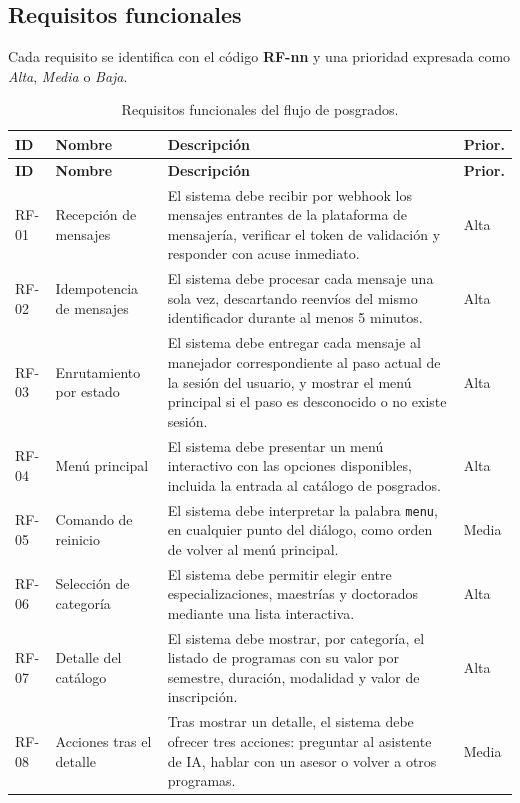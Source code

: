 \documentclass[12pt,a4paper]{report}
\newcommand{\tablacompacta}{\setstretch{1.1}\small}
\newcommand{\cabecera}[1]{\rowcolor{filacabecera}#1}
\begin{document}
\clearpage
\subsection{Requisitos funcionales}

Cada requisito se identifica con el código \textbf{RF-nn} y una prioridad expresada como
\textit{Alta}, \textit{Media} o \textit{Baja}.

{\tablacompacta
\begin{longtable}{p{1.4cm}p{3.3cm}p{7.4cm}p{1.4cm}}
\caption{Requisitos funcionales del flujo de posgrados.}\label{tab:rf}\\
\toprule
\cabecera{\textbf{ID}} & \textbf{Nombre} & \textbf{Descripción} & \textbf{Prior.} \\
\midrule
\endfirsthead
\toprule
\textbf{ID} & \textbf{Nombre} & \textbf{Descripción} & \textbf{Prior.} \\
\midrule
\endhead
\bottomrule
\endfoot
RF-01 & Recepción de mensajes & El sistema debe recibir por webhook los mensajes entrantes de la plataforma de mensajería, verificar el token de validación y responder con acuse inmediato. & Alta \\
RF-02 & Idempotencia de mensajes & El sistema debe procesar cada mensaje una sola vez, descartando reenvíos del mismo identificador durante al menos 5 minutos. & Alta \\
RF-03 & Enrutamiento por estado & El sistema debe entregar cada mensaje al manejador correspondiente al paso actual de la sesión del usuario, y mostrar el menú principal si el paso es desconocido o no existe sesión. & Alta \\
RF-04 & Menú principal & El sistema debe presentar un menú interactivo con las opciones disponibles, incluida la entrada al catálogo de posgrados. & Alta \\
RF-05 & Comando de reinicio & El sistema debe interpretar la palabra \texttt{menu}, en cualquier punto del diálogo, como orden de volver al menú principal. & Media \\
RF-06 & Selección de categoría & El sistema debe permitir elegir entre especializaciones, maestrías y doctorados mediante una lista interactiva. & Alta \\
RF-07 & Detalle del catálogo & El sistema debe mostrar, por categoría, el listado de programas con su valor por semestre, duración, modalidad y valor de inscripción. & Alta \\
RF-08 & Acciones tras el detalle & Tras mostrar un detalle, el sistema debe ofrecer tres acciones: preguntar al asistente de IA, hablar con un asesor o volver a otros programas. & Media \\

\end{longtable}}
\end{document}
